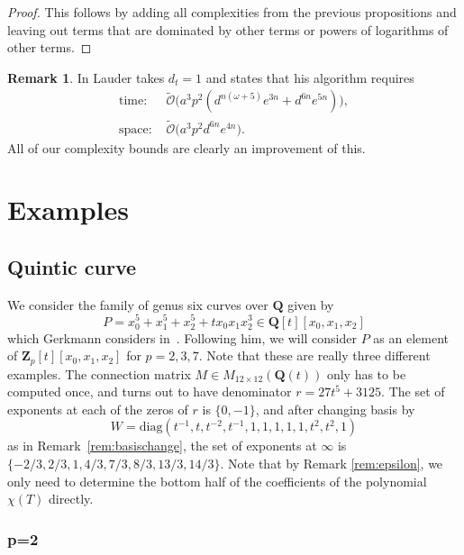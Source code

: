 \documentclass[a4paper,11pt]{article}
\numberwithin{equation}{section}
\newcommand{\ZZ}{\mathbf{Z}} %
\newcommand{\QQ}{\mathbf{Q}} %
\providecommand{\SoftOh}{\tilde{\mathcal{O}}} %
\theoremstyle{definition}
\newtheorem{rem}[thm]{Remark}
\begin{document}
\begin{proof}
This follows by adding all complexities from the previous propositions and 
leaving out terms that are dominated by other terms or powers of
logarithms of other terms.
\end{proof}

\begin{rem} In \citep{Lauder2004a} Lauder takes $d_t=1$ and states that his
algorithm requires
\begin{align*}
\mbox{time: }  &\SoftOh\bigl(a^3 p^2 (d^{n(\omega+5)} e^{3n} + d^{6n} e^{5n}) \bigr), \\ 
\mbox{space: } &\SoftOh\bigl(a^3 p^2 d^{6n} e^{4n} \bigr).
\end{align*}
All of our complexity bounds are clearly an improvement of this.
\end{rem}


\section{Examples}
\label{sec:Examples}

\subsection{Quintic curve}

We consider the family of genus six curves over $\QQ$ given by 
\begin{equation*}
P=x_0^5 + x_1^5 + x_2^5 + t x_0 x_1 x_2^3 \in \QQ[t][x_0,x_1,x_2]
\end{equation*}
which Gerkmann considers in~\citep[\S 7.4]{Gerkmann2007}. Following him, 
we will consider $P$ as an element of $\ZZ_p[t][x_0,x_1,x_2]$ for 
$p=2,3,7$. Note that these are really three different examples.
The connection matrix $M \in M_{12 \times 12}(\QQ(t))$ only has to 
be computed once, and turns out to have denominator $r=27t^5+3125$. 
The set of exponents at each of the zeros of $r$ is $\{0,-1\}$, and 
after changing basis by
\[ 
W=\mbox{diag}(t^{-1},t,t^{-2},t^{-1},1,1,1,1,1,t^2,t^2,1)
\] 
as in 
Remark~\ref{rem:basischange}, 
the set of exponents  at $\infty$ is $\{-2/3,2/3,1,4/3,7/3,8/3,13/3,14/3\}$. 
Note that by
Remark \ref{rem:epsilon}, we only need to determine the bottom 
half of the coefficients of the polynomial $\chi(T)$ directly.

\subsubsection{p=2}
\end{document}
